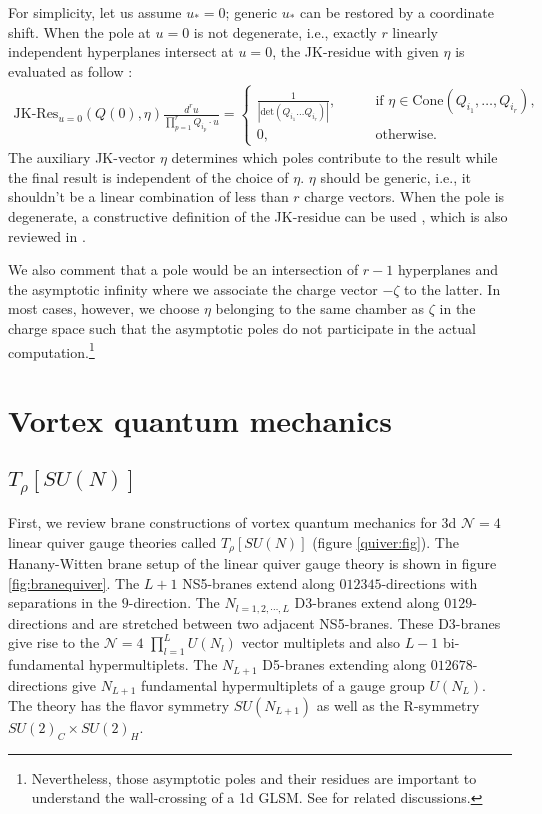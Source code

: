 \documentclass[a4paper,11pt]{article}
\begin{document}
For simplicity, let us assume $u_* = 0$; generic $u_*$ can be restored by a coordinate shift. When the pole at $u = 0$ is not degenerate, i.e., exactly $r$ linearly independent hyperplanes intersect at $u = 0$, the JK-residue with given $\eta$ is evaluated as follow \cite{1993alg.geom..7001J,1999math......3178B}:
\begin{align}
\text{JK-Res}_{u = 0}(Q(0),\eta) \frac{d^r u}{\prod_{p = 1}^r Q_{i_p} \cdot u} = \left\{\begin{array}{ll}
\frac{1}{|\mathrm{det}(Q_{i_1} \ldots Q_{i_r})|}, \qquad & \text{if $\eta \in \text{Cone}(Q_{i_1},\ldots,Q_{i_r})$,} \\
0, \qquad & \text{otherwise.}
\end{array}\right.
\end{align}
The auxiliary JK-vector $\eta$ determines which poles contribute to the result while the final result is independent of the choice of $\eta$. $\eta$ should be generic, i.e., it shouldn't be a linear combination of less than $r$ charge vectors. When the pole is degenerate, a constructive definition of the JK-residue can be used \cite{1999math......3178B,2004InMat.158..453S}, which is also reviewed in \cite{Benini:2013xpa}.

We also comment that a pole would be an intersection of $r-1$ hyperplanes and the asymptotic infinity where we associate the charge vector $-\zeta$ to the latter. In most cases, however, we choose $\eta$ belonging to the same chamber as $\zeta$ in the charge space such that the asymptotic poles do not participate in the actual computation.\footnote{Nevertheless, those asymptotic poles and their residues are important to understand the wall-crossing of a 1d GLSM. See \cite{Hori:2014tda} for related discussions.}
\\





\section{Vortex quantum mechanics}
\label{sec:vortex QM}
\subsection{$T_{\rho}[SU(N)]$}
\label{sec:T[SU(N)]}

First, we review brane constructions of vortex quantum mechanics \cite{Hanany:2003hp, Aganagic:2014oia, Bullimore:2016hdc} for 3d $\mathcal{N}=4$ linear quiver gauge theories called $T_{\rho} [SU(N)]$ (figure \ref{quiver:fig}).
The Hanany-Witten brane setup of the linear quiver gauge theory is shown in figure \ref{fig:branequiver}.
The $L+1$ NS5-branes extend along $012345$-directions with separations in the $9$-direction.
The $N_{l=1,2, \cdots, L}$ D3-branes extend along $0129$-directions and are stretched between two adjacent NS5-branes.
These D3-branes give rise to the $\mathcal{N}=4$ $\prod_{l=1}^L U(N_l)$ vector multiplets and
also $L-1$ bi-fundamental hypermultiplets.
The $N_{L+1}$ D5-branes extending along $012678$-directions give $N_{L+1}$ fundamental hypermultiplets of a gauge group $U(N_L)$. The theory has the flavor symmetry $SU(N_{L+1})$ as well as the R-symmetry $SU(2)_C \times SU(2)_H$.
\end{document}
